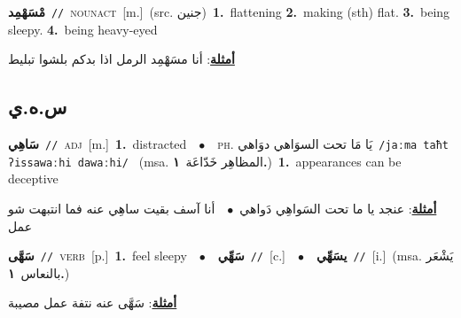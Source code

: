 \documentclass[10pt,a4paper,twoside]{article} %
\begin{document}
\begin{multicols}{2}
{\setlength\topsep{0pt}\textbf{\foreignlanguage{arabic}{مْسَهْمِد}}\ {\color{gray}\texttt{//}\color{black}}\ \textsc{noun\textunderscore act}\ [m.]\ (src. \color{gray}\foreignlanguage{arabic}{جنين}\color{black})\ \textbf{1.}~flattening  \textbf{2.}~making (sth) flat.  \textbf{3.}~being sleepy.  \textbf{4.}~being heavy-eyed\  \begin{flushright}\color{gray}\foreignlanguage{arabic}{\textbf{\underline{\foreignlanguage{arabic}{أمثلة}}}: أنا مسَهْمِد الرمل اذا بدكم بلشوا تبليط}\end{flushright}\color{black}} \vspace{2mm}

\vspace{-3mm}
\subsection*{\color{blue}\foreignlanguage{arabic}{س.ه.ي}\color{blue}{}} 

{\setlength\topsep{0pt}\textbf{\foreignlanguage{arabic}{سَاهِي}}\ {\color{gray}\texttt{//}\color{black}}\ \textsc{adj}\ [m.]\ \textbf{1.}~distracted\ \ $\bullet$\ \ \textsc{ph.} \color{gray} \foreignlanguage{arabic}{يَا مَا تحت السوَاهي دوَاهي}\color{black}\ {\color{gray}\texttt{/{\sffamily jaːma taħt ʔissawaːhi dawaːhi}/}\color{black}}\ \color{gray} (msa. \foreignlanguage{arabic}{المظاهِر خَدّاعَة}~\foreignlanguage{arabic}{\textbf{١.}})\color{black}\ \textbf{1.}~appearances can be deceptive\  \begin{flushright}\color{gray}\foreignlanguage{arabic}{\textbf{\underline{\foreignlanguage{arabic}{أمثلة}}}: عنجد يا ما تحت السَواهِي دَواهي\ $\bullet$\ \  أنا آسف بقيت ساهِي عنه فما انتبهت شو عمل}\end{flushright}\color{black}} \vspace{2mm}

{\setlength\topsep{0pt}\textbf{\foreignlanguage{arabic}{سَهَّى}}\ {\color{gray}\texttt{//}\color{black}}\ \textsc{verb}\ [p.]\ \textbf{1.}~feel sleepy\ \ $\bullet$\ \ \setlength\topsep{0pt}\textbf{\foreignlanguage{arabic}{سَهِّي}}\ {\color{gray}\texttt{//}\color{black}}\ [c.]\ \ $\bullet$\ \ \setlength\topsep{0pt}\textbf{\foreignlanguage{arabic}{يسَهِّي}}\ {\color{gray}\texttt{//}\color{black}}\ [i.]\ \color{gray}(msa. \foreignlanguage{arabic}{يَشْعَر بالنعاس}~\foreignlanguage{arabic}{\textbf{١.}})\color{black}\  \begin{flushright}\color{gray}\foreignlanguage{arabic}{\textbf{\underline{\foreignlanguage{arabic}{أمثلة}}}: سَهَّى عنه نتفة عمل مصيبة}\end{flushright}\color{black}} \vspace{2mm}


\end{multicols}
\end{document}
